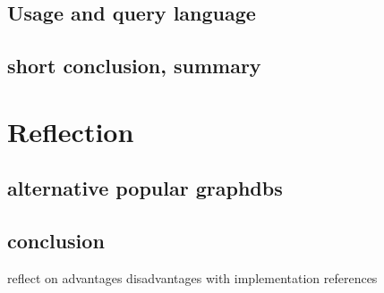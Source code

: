 \subsection{Usage and query language}
\subsection{short conclusion, summary}

\section{Reflection}
\subsection{alternative popular graphdbs}
\subsection{conclusion}
reflect on advantages disadvantages with implementation references
